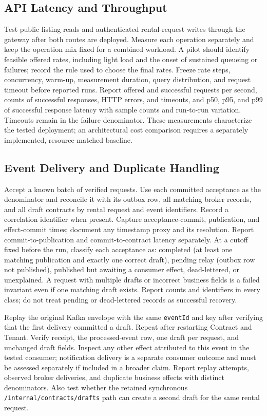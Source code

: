 \subsection{API Latency and Throughput}
Test public listing reads and authenticated rental-request writes through the gateway after both routes are deployed. Measure each operation separately and keep the operation mix fixed for a combined workload. A pilot should identify feasible offered rates, including light load and the onset of sustained queueing or failures; record the rule used to choose the final rates. Freeze rate steps, concurrency, warm-up, measurement duration, query distribution, and request timeout before reported runs. Report offered and successful requests per second, counts of successful responses, HTTP errors, and timeouts, and p50, p95, and p99 of successful response latency with sample counts and run-to-run variation. Timeouts remain in the failure denominator. These measurements characterize the tested deployment; an architectural cost comparison requires a separately implemented, resource-matched baseline.

\subsection{Event Delivery and Duplicate Handling}
Accept a known batch of verified requests. Use each committed acceptance as the denominator and reconcile it with its outbox row, all matching broker records, and all draft contracts by rental request and event identifiers. Record a correlation identifier when present. Capture acceptance-commit, publication, and effect-commit times; document any timestamp proxy and its resolution. Report commit-to-publication and commit-to-contract latency separately. At a cutoff fixed before the run, classify each acceptance as: completed (at least one matching publication and exactly one correct draft), pending relay (outbox row not published), published but awaiting a consumer effect, dead-lettered, or unexplained. A request with multiple drafts or incorrect business fields is a failed invariant even if one matching draft exists. Report counts and identifiers in every class; do not treat pending or dead-lettered records as successful recovery.

Replay the original Kafka envelope with the same \texttt{eventId} and key after verifying that the first delivery committed a draft. Repeat after restarting Contract and Tenant. Verify receipt, the processed-event row, one draft per request, and unchanged draft fields. Inspect any other effect attributed to this event in the tested consumer; notification delivery is a separate consumer outcome and must be assessed separately if included in a broader claim. Report replay attempts, observed broker deliveries, and duplicate business effects with distinct denominators. Also test whether the retained synchronous \texttt{/internal/contracts/drafts} path can create a second draft for the same rental request.

